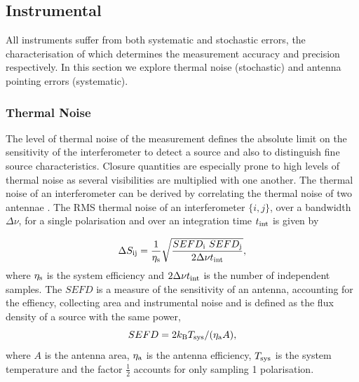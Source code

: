 \subsection{Instrumental}\label{sec:instrument}

All instruments suffer from both systematic and stochastic errors, the characterisation of which determines the measurement accuracy and precision respectively. In this section we explore thermal noise (stochastic) and antenna pointing errors (systematic). 

\subsubsection{Thermal Noise}

The level of thermal noise of the measurement defines the absolute limit on the sensitivity of the interferometer to detect a source and also to distinguish fine source characteristics. Closure quantities are especially prone to high levels of thermal noise as several visibilities are multiplied with one another. The thermal noise of an interferometer can be derived by correlating the thermal noise of two antennae \citep*{Wrobel_1999}. The RMS thermal noise of an interferometer $\{i,j\}$, over a bandwidth $\Delta \nu$, for a single polarisation and over an integration time $t_{\rm int}$ is given by 

\begin{equation}
 \Delta S_{\rm ij} = \frac{1}{\eta_{\rm s}}\sqrt{\frac{SEFD_{\rm i}\ SEFD_{\rm j}}{2 \Delta \nu t_{\rm int}}},  
\end{equation}
where $\eta_{\rm s}$ is the system efficiency and $2 \Delta \nu t_{\rm int}$ is the number of independent samples. The $SEFD$ is a measure of the sensitivity of an antenna, accounting for the effiency, collecting area and instrumental noise and is defined as the flux density of a source with the same power,
\begin{equation}
 SEFD = 2 k_{\rm B} T_{\rm sys} / (\eta_{\rm a} A),
\end{equation}
where $A$ is the antenna area, $\eta_{\rm a}$ is the antenna efficiency, $T_{\rm sys}$ is the system temperature and the factor $\frac{1}{2}$ accounts for only sampling 1 polarisation.


